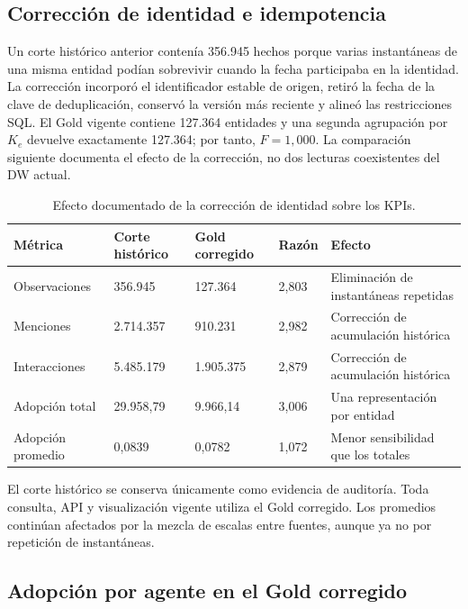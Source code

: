 \documentclass[12pt,a4paper]{article}
\begin{document}
\subsection{Corrección de identidad e idempotencia}

Un corte histórico anterior contenía 356.945 hechos porque varias instantáneas de una misma entidad podían sobrevivir cuando la fecha participaba en la identidad. La corrección incorporó el identificador estable de origen, retiró la fecha de la clave de deduplicación, conservó la versión más reciente y alineó las restricciones SQL. El Gold vigente contiene 127.364 entidades y una segunda agrupación por $K_e$ devuelve exactamente 127.364; por tanto, $F=1,000$. La comparación siguiente documenta el efecto de la corrección, no dos lecturas coexistentes del DW actual.

\begin{table}[H]
\centering
\small
{}
\begin{tabularx}{\textwidth}{P{3.2cm} P{2.2cm} P{2.2cm} P{2.0cm} Y}
\toprule
{}
\textbf{Métrica} & \textbf{Corte histórico} & \textbf{Gold corregido} & \textbf{Razón} & \textbf{Efecto} \\
\midrule
Observaciones & 356.945 & 127.364 & 2,803 & Eliminación de instantáneas repetidas \\
Menciones & 2.714.357 & 910.231 & 2,982 & Corrección de acumulación histórica \\
Interacciones & 5.485.179 & 1.905.375 & 2,879 & Corrección de acumulación histórica \\
Adopción total & 29.958,79 & 9.966,14 & 3,006 & Una representación por entidad \\
Adopción promedio & 0,0839 & 0,0782 & 1,072 & Menor sensibilidad que los totales \\
\bottomrule
\end{tabularx}
\caption{Efecto documentado de la corrección de identidad sobre los KPIs.}
\label{tab:robustez}
\end{table}

El corte histórico se conserva únicamente como evidencia de auditoría. Toda consulta, API y visualización vigente utiliza el Gold corregido. Los promedios continúan afectados por la mezcla de escalas entre fuentes, aunque ya no por repetición de instantáneas.

\subsection{Adopción por agente en el Gold corregido}
\end{document}

